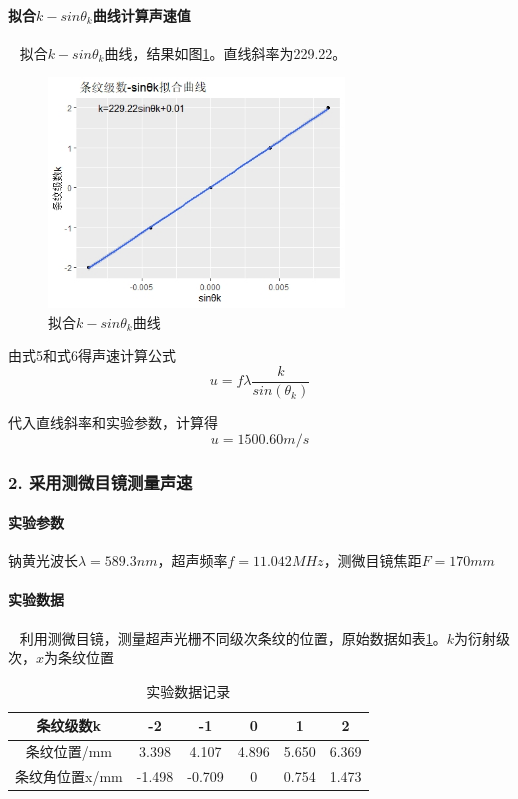 \documentclass[12pt,a4paper,UTF8]{ctexart}
\begin{document}
		\paragraph{拟合$k-sin\theta_k$曲线计算声速值}~
		\newline
		\indent
		拟合$k-sin\theta_k$曲线，结果如图\ref{fig:1}。直线斜率为229.22。
		\begin{figure}[htbp]
			\centering
			\includegraphics[width=0.7\textwidth]{img//curve1.jpeg}
			\caption{拟合$k-sin\theta_k$曲线}
			\label{fig:1}
		\end{figure}
		
		由式5和式6得声速计算公式
		\begin{equation}\label{eq:5}
			u = f\lambda\frac{k}{sin(\theta_k)}
		\end{equation}
		
		代入直线斜率和实验参数，计算得
		$$
		u = 1500.60 m/s
		$$


\subsubsection*{2. 采用测微目镜测量声速}
		\paragraph{实验参数} 钠黄光波长$\lambda = 589.3 nm$，超声频率$f = 11.042 MHz$，测微目镜焦距$F = 170mm$
		\paragraph{实验数据}~
		\newline
		\indent
		利用测微目镜，测量超声光栅不同级次条纹的位置，原始数据如表\ref{tab:2}。$k$为衍射级次，$x$为条纹位置

\begin{table}[htbp]
	\centering
	\caption{实验数据记录}
	\begin{tabular}[width=textwidth]{cccccc}
	\toprule
	条纹级数k    & -2 & -1  & 0 & 1 & 2 \\
	\midrule
	条纹位置/mm    & 3.398 & 4.107 & 4.896 & 5.650 & 6.369 \\
	条纹角位置x/mm   & -1.498 & -0.709 & 0 & 0.754 & 1.473 \\
	\bottomrule
	\end{tabular}
	\label{tab:2}
\end{table}
\end{document}
